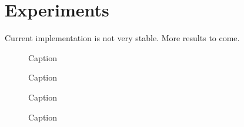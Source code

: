 \section{Experiments}
Current implementation is not very stable. More results to come. 

\begin{figure}
    \centering
    
    \caption{Caption}
\end{figure}

\begin{figure}
    \centering
    
    \caption{Caption}
\end{figure}

\begin{figure}
    \centering
    
    \caption{Caption}
\end{figure}

\begin{figure}
    \centering
    
    \caption{Caption}
\end{figure}